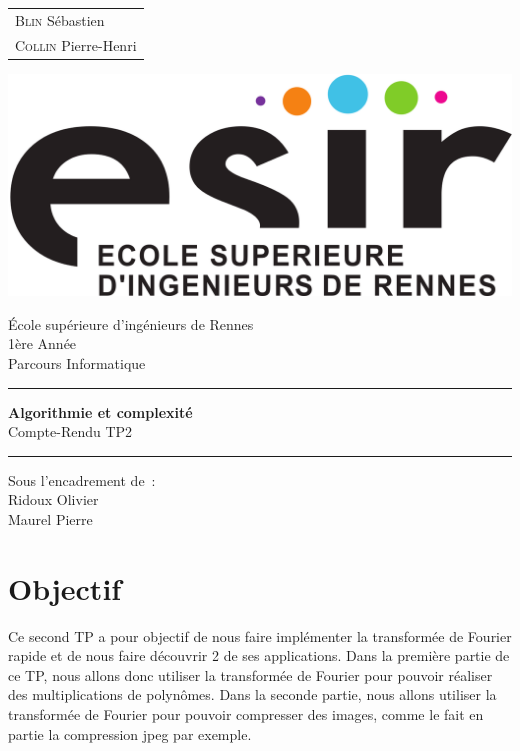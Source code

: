 \documentclass{article}
\begin{document}
\begin{titlepage}
  \vspace{-20px}
  \begin{tabular}{l}
    \textsc{Blin} S\'ebastien\\
    \textsc{Collin} Pierre-Henri
  \end{tabular}
  \hfill \vspace{10px}\includegraphics[scale=0.1]{esir.png}\\
  \vfill
  \begin{center}
    \Huge{\'Ecole sup\'erieure d'ing\'enieurs de Rennes}\\
    \vspace{1cm}
    \LARGE{1\`ere Ann\'ee}\\
    \large{Parcours Informatique}\\
    \vspace{0.5cm}\hrule\vspace{0.5cm}
    \LARGE{\textbf{Algorithmie et complexité}}\\
    \Large{Compte-Rendu TP2}
    \vspace{0.5cm}\hrule
    \vfill
    \vfill
  \end{center}
  \begin{flushleft}
    \Large{Sous l'encadrement de~:}\\
    \vspace{0.2cm}
    \large{{Ridoux} Olivier}\\
    \large{{Maurel} Pierre}
  \end{flushleft}
  \vfill
\end{titlepage}

\section{Objectif}
Ce second TP a pour objectif de nous faire implémenter la transformée de Fourier rapide et de nous faire découvrir 2 de ses applications. Dans la première partie de ce TP, nous allons donc utiliser la transformée de Fourier pour pouvoir réaliser des multiplications de polynômes. Dans la seconde partie, nous allons utiliser la transformée de Fourier pour pouvoir compresser des images, comme le fait en partie la compression jpeg par exemple.
\end{document}
